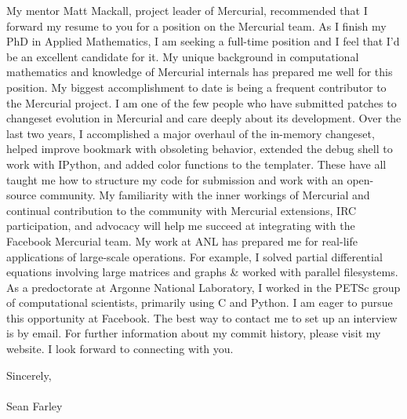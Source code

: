 \documentclass[]{fancy-cv}
\begin{document}
My mentor Matt Mackall, project leader of Mercurial, recommended that I forward
my resume to you for a position on the Mercurial team. As I finish my PhD in
Applied Mathematics, I am seeking a full-time position and I feel that I’d be
an excellent candidate for it.
%
\newline\newline
%
My unique background in computational mathematics and knowledge of Mercurial
internals has prepared me well for this position. My biggest accomplishment to
date is being a frequent contributor to the Mercurial project. I am one of the
few people who have submitted patches to changeset evolution in Mercurial and
care deeply about its development.
%
\newline\newline
%
Over the last two years, I accomplished a major overhaul of the in-memory
changeset, helped improve bookmark with obsoleting behavior, extended the debug
shell to work with IPython, and added color functions to the templater. These
have all taught me how to structure my code for submission and work with an
open-source community. My familiarity with the inner workings of Mercurial and
continual contribution to the community with Mercurial extensions, IRC
participation, and advocacy will help me succeed at integrating with the
Facebook Mercurial team.
%
\newline\newline
%
My work at ANL has prepared me for real-life applications of large-scale
operations. For example, I solved partial differential equations involving
large matrices and graphs \& worked with parallel filesystems. As a
predoctorate at Argonne National Laboratory, I worked in the PETSc group of
computational scientists, primarily using C and Python.
%
\newline\newline
%
I am eager to pursue this opportunity at Facebook. The best way to contact me
to set up an interview is by email. For further information about my commit
history, please visit my website. I look forward to connecting with you.

\vspace{2em}
Sincerely,\\
\\
Sean Farley
\end{document}
